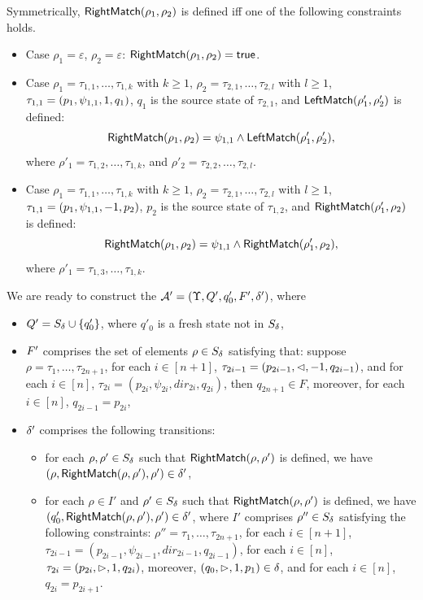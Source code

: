 %
Symmetrically, $\mathsf{RightMatch}(\rho_1, \rho_2)$ is defined iff one of the following constraints holds.
\begin{itemize}
\item Case $\rho_1 = \varepsilon$, $\rho_2 = \varepsilon$: $\mathsf{RightMatch}(\rho_1, \rho_2) = \mathsf{true}$.

\item Case $\rho_1 =  \tau_{1,1}, \ldots, \tau_{1,k}$ with $k \ge 1$, $\rho_2 = \tau_{2,1}, \ldots, \tau_{2,l}$ with $l \ge 1$, $\tau_{1,1} = (p_1, \psi_{1,1}, 1, q_1)$, $q_1$ is the source state of $\tau_{2,1}$, and $\mathsf{LeftMatch}(\rho'_{1}, \rho'_2)$ is defined:  
$$\mathsf{RightMatch}(\rho_1, \rho_2) =\psi_{1,1} \wedge \mathsf{LeftMatch}(\rho'_{1}, \rho'_2),$$ 
where $\rho'_1 = \tau_{1, 2},\ldots, \tau_{1,k}$, and $\rho'_2 = \tau_{2,2}, \ldots, \tau_{2,l}$.
%
\item Case $\rho_1 =  \tau_{1,1}, \ldots, \tau_{1,k}$ with $k \ge 1$, $\rho_2 = \tau_{2,1}, \ldots, \tau_{2,l}$ with $l \ge 1$, $\tau_{1,1} = (p_1, \psi_{1,1}, -1, p_2)$, $p_2$ is the source state of $\tau_{1,2}$, and $\mathsf{RightMatch}(\rho'_1, \rho_2)$ is defined:  
$$\mathsf{RightMatch}(\rho_1, \rho_2) = \psi_{1,1} \wedge \mathsf{RightMatch}(\rho'_1, \rho_2),$$ 
where $\rho'_1 = \tau_{1,3}, \ldots, \tau_{1,k}$.
%
\end{itemize}

We are ready to construct the \SA{} $\mathcal{A}' =  (\Upsilon, Q', q'_0, F', \delta')$, where
\begin{itemize}
\item $Q' = S_{\delta} \cup \{q'_0\}$, where $q'_0$ is a fresh state not in $S_{\delta}$,
%
\item $F'$ comprises the set of elements $\rho \in S_{\delta}$ satisfying that: suppose $\rho = \tau_1, \ldots, \tau_{2n+1}$, for each $i \in [n+1]$, $\tau_{2i-1} = (p_{2i-1}, \vartriangleleft, -1, q_{2i-1})$, and for each $i \in [n]$, $\tau_{2i} = (p_{2i}, \psi_{2i}, dir_{2i}, q_{2i})$, then $q_{2n+1} \in F$, moreover, for each $i \in [n]$, $q_{2i-1} = p_{2i}$,  
%
\item $\delta'$ comprises the following transitions: 
%
\begin{itemize}
%
\item for each $\rho, \rho' \in S_{\delta}$ such that $\mathsf{RightMatch}(\rho, \rho')$ is defined, we have $(\rho, \mathsf{RightMatch}(\rho, \rho'), \rho') \in \delta'$,
%
\item  
%
for each $\rho \in I'$ and $\rho' \in S_{\delta}$ such that $\mathsf{RightMatch}(\rho, \rho')$ is defined, we have $(q'_0, \mathsf{RightMatch}(\rho, \rho'), \rho') \in \delta'$, where 
$I'$ comprises $\rho'' \in S_{\delta}$ satisfying the following constraints: $\rho'' = \tau_1, \ldots, \tau_{2n+1}$,  for each $i \in [n+1]$, $\tau_{2i-1} = (p_{2i-1}, \psi_{2i-1}, dir_{2i-1}, q_{2i-1})$, for each $i \in [n]$, $\tau_{2i} = (p_{2i}, \vartriangleright, 1, q_{2i})$, moreover, $(q_0, \vartriangleright, 1, p_1) \in \delta$, and for each $i \in [n]$, $q_{2i} = p_{2i+1}$. 
\end{itemize}
%
\end{itemize}

